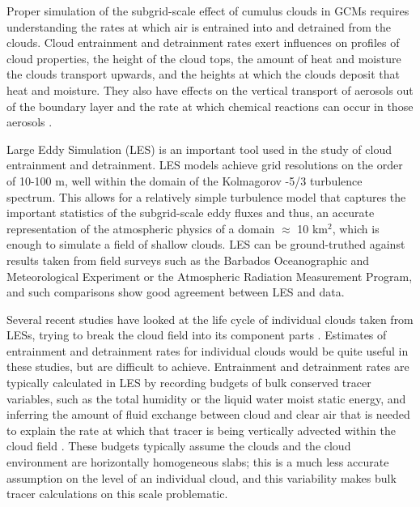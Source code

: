 \documentclass[12pt]{article}
\begin{document}
Proper simulation of the subgrid-scale effect of cumulus clouds in GCMs requires 
understanding the rates at which air is entrained into and detrained from the 
clouds. Cloud entrainment and detrainment rates exert influences on profiles of 
cloud properties, the height of the cloud tops, the amount of heat and moisture 
the clouds transport upwards, and the heights at which the clouds deposit that 
heat and moisture.  They also have effects on the vertical transport of 
aerosols out of the boundary layer and the rate at which chemical reactions can 
occur in those aerosols \citep{Barahona2007,Anldrejczuk2008}.

Large Eddy Simulation (LES) is an important tool used in the study of cloud 
entrainment and detrainment. LES models achieve grid resolutions on the order 
of 10-100 m, well within the domain of the Kolmagorov -5/3 turbulence spectrum. 
This allows for a relatively simple turbulence model that captures the 
important statistics of the subgrid-scale eddy fluxes and thus, an accurate 
representation of the atmospheric physics of a domain $\approx$ 10 km$^{2}$, 
which is enough to simulate a field of shallow clouds.  LES can be 
ground-truthed against results taken from field surveys such as the Barbados 
Oceanographic and Meteorological Experiment \citep[BOMEX;][]{Holland1973} or 
the Atmospheric Radiation Measurement \citep[ARM;][]{Brown2002} Program, and 
such comparisons show good agreement between LES and data.

Several recent studies have looked at the life cycle of individual clouds taken 
from LESs, trying to break the cloud field into its component parts 
\citep{Zhao2005,Zhao2005a,Heus2009}.  Estimates of entrainment and detrainment 
rates for individual clouds would be quite useful in these studies, but are 
difficult to achieve. Entrainment and detrainment rates are typically 
calculated in LES by recording budgets of bulk conserved tracer variables, 
such as the total humidity or the liquid water moist static energy, and 
inferring the amount of fluid exchange between cloud and clear air that is 
needed to explain the rate at which that tracer is being vertically advected 
within the cloud field \citep{Siebesma1995}. These budgets typically assume 
the clouds and the cloud environment are horizontally homogeneous slabs; this 
is a much less accurate assumption on the level of an individual cloud, and 
this variability makes bulk tracer calculations on this scale problematic.
\end{document}

